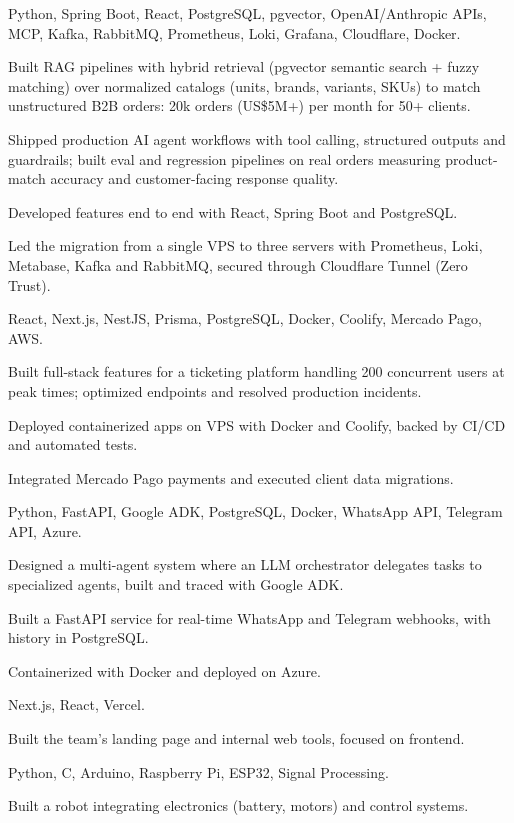 \documentclass[10pt]{article}
\begin{document}
      {Python, Spring Boot, React, PostgreSQL, pgvector, OpenAI/Anthropic APIs, MCP, Kafka, RabbitMQ, Prometheus, Loki, Grafana, Cloudflare, Docker.}{
      \item Built RAG pipelines with hybrid retrieval (pgvector semantic search + fuzzy matching) over normalized catalogs (units, brands, variants, SKUs) to match unstructured B2B orders: 20k orders (US\$5M+) per month for 50+ clients.
      \item Shipped production AI agent workflows with tool calling, structured outputs and guardrails; built eval and regression pipelines on real orders measuring product-match accuracy and customer-facing response quality.
      \item Developed features end to end with React, Spring Boot and PostgreSQL.
      \item Led the migration from a single VPS to three servers with Prometheus, Loki, Metabase, Kafka and RabbitMQ, secured through Cloudflare Tunnel (Zero Trust).
    }
      {React, Next.js, NestJS, Prisma, PostgreSQL, Docker, Coolify, Mercado Pago, AWS.}{
      \item Built full-stack features for a ticketing platform handling 200 concurrent users at peak times; optimized endpoints and resolved production incidents.
      \item Deployed containerized apps on VPS with Docker and Coolify, backed by CI/CD and automated tests.
      \item Integrated Mercado Pago payments and executed client data migrations.
    }
      {Python, FastAPI, Google ADK, PostgreSQL, Docker, WhatsApp API, Telegram API, Azure.}{
      \item Designed a multi-agent system where an LLM orchestrator delegates tasks to specialized agents, built and traced with Google ADK.
      \item Built a FastAPI service for real-time WhatsApp and Telegram webhooks, with history in PostgreSQL.
      \item Containerized with Docker and deployed on Azure.
    }
      {Next.js, React, Vercel.}{
      \item Built the team's landing page and internal web tools, focused on frontend.
    }
      {Python, C, Arduino, Raspberry Pi, ESP32, Signal Processing.}{
      \item Built a robot integrating electronics (battery, motors) and control systems.
    }
\end{document}
